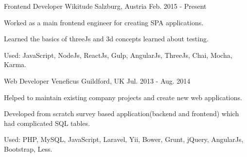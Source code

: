 

\begin{cventries}

  \cventry
    {Frontend Developer} %
    {Wikitude} %
    {Salzburg, Austria} %
    {Feb. 2015 - Present} %
    {
      \begin{cvitems} %
        \item {Worked as a main frontend engineer for creating SPA applications.}
        \item {Learned the basics of threeJs and 3d concepts learned about testing.}
        \item {Used: JavaScript, NodeJs, ReactJs, Gulp, AngularJs, ThreeJs, Chai, Mocha, Karma.}
      \end{cvitems}
    }

  \cventry
    {Web Developer} %
    {Veneficus} %
    {Guildford, UK} %
    {Jul. 2013 - Aug. 2014} %
    {
      \begin{cvitems} %
        \item {Helped to maintain existing company projects and create new web applications.}
        \item {Developed from scratch survey based application(backend and frontend) which had complicated SQL tables.}
        \item {Used: PHP, MySQL, JavaScript, Laravel, Yii, Bower, Grunt, jQuery, AngularJs, Bootstrap, Less.}
      \end{cvitems}
    }

\end{cventries}
